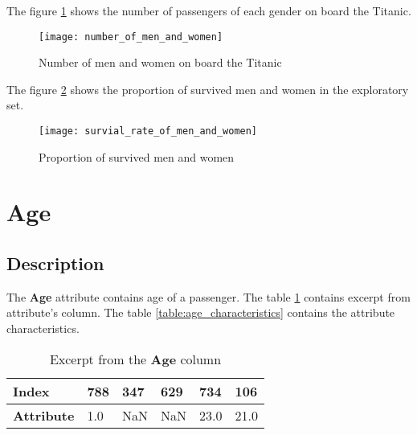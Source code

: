 The figure \ref{pic:number_of_men_and_women} shows the number of passengers 
of each gender on board the Titanic. 

\begin{figure}
    \centering
    \texttt{[image: number\_of\_men\_and\_women]}
    \caption{Number of men and women on board the Titanic}
    \label{pic:number_of_men_and_women}
\end{figure}

The figure \ref{pic:survial_rate_of_men_and_women} shows the proportion 
of survived men and women in the exploratory set.

\begin{figure}
    \centering
    \texttt{[image: survial\_rate\_of\_men\_and\_women]}
    \caption{Proportion of survived men and women}
    \label{pic:survial_rate_of_men_and_women}
\end{figure}


\section{Age} \label{section:Age}
\subsection{Description}
The \textbf{Age} attribute contains age of a passenger. The table 
\ref{table:age_head} contains excerpt from attribute's column. The table
\ref{table:age_characteristics} contains the attribute characteristics.

\begin{table}[!ht]
    \centering
    \caption{Excerpt from the \textbf{Age} column}
    \begin{tabular}{|l|l|l|l|l|l|}
        \hline
        \textbf{Index}     & 788 & 347 & 629 & 734  & 106  \\ \hline
        \textbf{Attribute} & 1.0 & NaN & NaN & 23.0 & 21.0 \\ \hline
    \end{tabular}
    \label{table:age_head}
\end{table}

